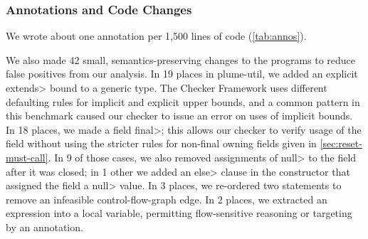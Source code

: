 

\subsubsection{Annotations and Code Changes}\label{sec:annotations-and-code-changes}
\label{sec:annos}



We wrote about one annotation per 1,500 lines of code (\cref{tab:annos}).

We also
made 42 small, semantics-preserving changes to the programs to reduce
false positives from our analysis.
%
In 19 places in plume-util, we added an explicit \<extends> bound to a generic type.
The Checker Framework uses different defaulting rules for implicit and explicit
upper bounds, and a common pattern in this benchmark caused our checker to issue
an error on uses of implicit bounds.
%
In 18 places, we made a field \<final>; this allows our checker to verify usage
of the field without using the stricter rules for non-final owning fields given in \cref{sec:reset-must-call}.
In 9 of those cases, we also removed assignments of \<null> to the field after it was closed; in 1 other we added an \<else> clause in the constructor that assigned the field
a \<null> value.
%
In 3 places, we re-ordered two statements to remove an
infeasible control-flow-graph edge.
%
In 2 places, we extracted an expression into a local variable, permitting
flow-sensitive reasoning or targeting by an \CreatesMustCallFor annotation.

